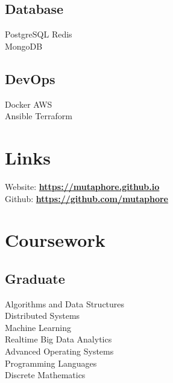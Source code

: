 \documentclass[letterpaper]{deedy-resume} %
\begin{document}
\begin{minipage}[t]{0.33\textwidth}
\subsection{Database}
PostgreSQL \textbullet{}
Redis \\
MongoDB
\sectionspace
\subsection{DevOps}
Docker \textbullet{}
AWS \\
Ansible \textbullet{}
Terraform

\sectionspace %


\section{Links} 

Website: \href{https://mutaphore.github.io}{\bf https://mutaphore.github.io} \\
Github: \href{https://github.com/mutaphore}{\bf https://github.com/mutaphore} \\

\sectionspace %


\section{Coursework}

\subsection{Graduate}

Algorithms and Data Structures \\
Distributed Systems \\
Machine Learning \\
Realtime Big Data Analytics \\
Advanced Operating Systems \\
Programming Languages \\
Discrete Mathematics

\sectionspace %



\end{minipage}
\end{document}

